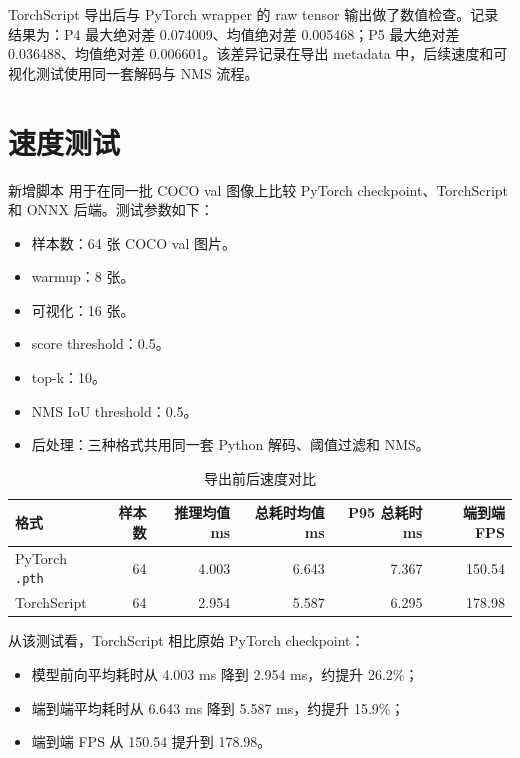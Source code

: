 \documentclass[11pt,a4paper]{article}
\begin{document}
TorchScript 导出后与 PyTorch wrapper 的 raw tensor 输出做了数值检查。记录结果为：P4 最大绝对差 0.074009、均值绝对差 0.005468；P5 最大绝对差 0.036488、均值绝对差 0.006601。该差异记录在导出 metadata 中，后续速度和可视化测试使用同一套解码与 NMS 流程。

\section{速度测试}

新增脚本  用于在同一批 COCO val 图像上比较 PyTorch checkpoint、TorchScript 和 ONNX 后端。测试参数如下：

\begin{itemize}[leftmargin=2em]
  \item 样本数：64 张 COCO val 图片。
  \item warmup：8 张。
  \item 可视化：16 张。
  \item score threshold：0.5。
  \item top-k：10。
  \item NMS IoU threshold：0.5。
  \item 后处理：三种格式共用同一套 Python 解码、阈值过滤和 NMS。
\end{itemize}

\begin{table}[H]
  \centering
  \caption{导出前后速度对比}
  \begin{tabular}{lrrrrr}
    \toprule
    格式 & 样本数 & 推理均值 ms & 总耗时均值 ms & P95 总耗时 ms & 端到端 FPS \\
    \midrule
    PyTorch \texttt{.pth} & 64 & 4.003 & 6.643 & 7.367 & 150.54 \\
    TorchScript & 64 & 2.954 & 5.587 & 6.295 & 178.98 \\
    \bottomrule
  \end{tabular}
\end{table}

从该测试看，TorchScript 相比原始 PyTorch checkpoint：

\begin{itemize}[leftmargin=2em]
  \item 模型前向平均耗时从 4.003 ms 降到 2.954 ms，约提升 26.2\%；
  \item 端到端平均耗时从 6.643 ms 降到 5.587 ms，约提升 15.9\%；
  \item 端到端 FPS 从 150.54 提升到 178.98。
\end{itemize}
\end{document}
